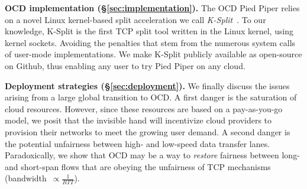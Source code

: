 \documentclass[newfonts=false,format=sigconf,10pt,letterpaper]{acmart}
\newcommand{\T}[1]{\smallskip\noindent\textbf{#1}} %
\newcommand{\name}{Pied Piper\xspace}
\newcommand{\ksplit}{K-Split\xspace}
\begin{document}
\T{OCD implementation (\S\ref{sec:implementation}).} The OCD \name relies on a novel Linux kernel-based split acceleration we call \textit{\ksplit}~\cite{ktcp}. To our knowledge, \ksplit is the first TCP split tool written in the Linux kernel, using kernel sockets. Avoiding the penalties that stem from the numerous system calls of user-mode implementations. We make \ksplit publicly available as open-source on Github, thus enabling any user to try \name on any cloud. 

\T{Deployment strategies (\S\ref{sec:deployment}).} We finally discuss the issues arising from a large global transition to OCD. A first danger is the saturation of cloud resources. However, since these resources are based on a pay-as-you-go model, we posit that the invisible hand will incentivize cloud providers to provision their networks to meet the growing user demand.  
A second danger is the potential unfairness between high- and low-speed data transfer lanes. Paradoxically, we show that OCD may be a way to \textit{restore} fairness between long- and short-span flows that are obeying the unfairness of TCP mechanisms (bandwidth~$\propto \frac{1}{RTT}$).%
\end{document}
